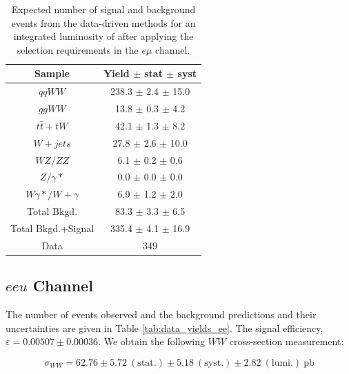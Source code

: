 \begin{table}[ht!]
  \begin{center}
  \begin{tabular} {|c|c|}
\hline
Sample                & Yield $\pm$ stat $\pm$ syst \\ \hline \hline
$qqWW$                & 238.3 $\pm$  2.4 $\pm$ 15.0  \\ \hline
$ggWW$                & 13.8 $\pm$  0.3 $\pm$  4.2  \\ \hline
$t\bar{t} + tW$      & 42.1 $\pm$  1.3 $\pm$  8.2  \\ \hline
$W+jets$              & 27.8 $\pm$  2.6 $\pm$ 10.0  \\ \hline
$WZ$/$ZZ$             &  6.1 $\pm$  0.2 $\pm$  0.6  \\ \hline
$Z/\gamma*$          &  0.0 $\pm$  0.0 $\pm$  0.0  \\ \hline
$W\gamma*/W+\gamma$ &  6.9 $\pm$  1.2 $\pm$  2.0  \\ \hline \hline
Total Bkgd.           & 83.3 $\pm$  3.3 $\pm$  6.5  \\ \hline \hline
Total Bkgd.+Signal    & 335.4 $\pm$  4.1 $\pm$ 16.9  \\ \hline \hline
Data                  & 349 \\ \hline
\end{tabular}
  \caption{Expected number of signal and background events from the data-driven methods for
  an integrated luminosity of \intlumi after applying the selection requirements in the $e \mu$ channel.}
   \label{tab:data_yields_em}
  \end{center}
\end{table}

%
%
%
\subsection{$eeu$ Channel}

The number of events observed and the background predictions and their uncertainties are
given in Table \ref{tab:data_yields_ee}.
The signal efficiency,  $\varepsilon = 0.00507 \pm 0.00036$.
We obtain the following $WW$ cross-section measurement:

\begin{equation*}
\sigma_{WW}  = 62.76 \pm 5.72~\mathrm{(stat.)} \pm 5.18~\mathrm{(syst.)} \pm 2.82~\mathrm{(lumi.)~pb} 
\end{equation*}

